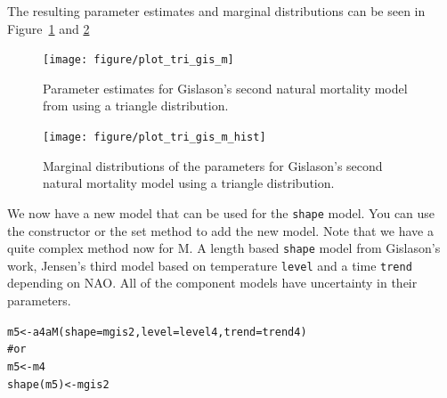 \documentclass[a4paper,english,10pt]{article}\usepackage[]{graphicx}\usepackage[]{color}
\makeatletter
\newcommand{\hlcom}[1]{\textcolor[rgb]{0.2,0.267,0.4}{#1}}%
\newcommand{\hlstd}[1]{\textcolor[rgb]{0,0,0}{#1}}%
\newcommand{\hlkwb}[1]{\textcolor[rgb]{0.361,0.506,0.596}{#1}}%
\newcommand{\hlkwc}[1]{\textcolor[rgb]{0.361,0.506,0.596}{#1}}%
\newcommand{\hlkwd}[1]{\textcolor[rgb]{0.361,0.506,0.596}{#1}}%
\newenvironment{kframe}{%
 \def\at@end@of@kframe{}%
 \ifinner\ifhmode%
  \def\at@end@of@kframe{\end{minipage}}%
  \begin{minipage}{\columnwidth}%
 \fi\fi%
 \def\FrameCommand##1{\hskip\@totalleftmargin \hskip-\fboxsep
 \colorbox{shadecolor}{##1}\hskip-\fboxsep
     \hskip-\linewidth \hskip-\@totalleftmargin \hskip\columnwidth}%
 \MakeFramed {\advance\hsize-\width
   \@totalleftmargin\z@ \linewidth\hsize
   \@setminipage}}%
 {\par\unskip\endMakeFramed%
 \at@end@of@kframe}
\newenvironment{knitrout}{}{} %
\newcommand{\code}[1]{{\texttt{#1}}}
\makeatother
\begin{document}
The resulting parameter estimates and marginal distributions can be seen in Figure~\ref{fig:plot_tri_gis_m} and \ref{fig:plot_tri_gis_m_hist}

\begin{knitrout}
\color{fgcolor}\begin{figure}[H]


{\centering \texttt{[image: figure/plot\_tri\_gis\_m]} 

}

\caption[Parameter estimates for Gislason's second natural mortality model from using a triangle distribution]{Parameter estimates for Gislason's second natural mortality model from using a triangle distribution.\label{fig:plot_tri_gis_m}}
\end{figure}


\end{knitrout}

\begin{knitrout}
\color{fgcolor}\begin{figure}[H]


{\centering \texttt{[image: figure/plot\_tri\_gis\_m\_hist]} 

}

\caption[Marginal distributions of the parameters for Gislason's second natural mortality model using a triangle distribution]{Marginal distributions of the parameters for Gislason's second natural mortality model using a triangle distribution.\label{fig:plot_tri_gis_m_hist}}
\end{figure}


\end{knitrout}

We now have a new model that can be used for the \code{shape} model. You can use the constructor or the set method to add the new model. Note that we have a quite complex method now for M. A length based \code{shape} model from Gislason's work, Jensen's third model based on temperature \code{level} and a time \code{trend} depending on NAO. All of the component models have uncertainty in their parameters.

\begin{knitrout}
\color{fgcolor}\begin{kframe}
\begin{alltt}
\hlstd{m5} \hlkwb{<-} \hlkwd{a4aM}\hlstd{(}\hlkwc{shape}\hlstd{=mgis2,} \hlkwc{level}\hlstd{=level4,} \hlkwc{trend}\hlstd{=trend4)}
\hlcom{# or}
\hlstd{m5} \hlkwb{<-} \hlstd{m4}
\hlkwd{shape}\hlstd{(m5)} \hlkwb{<-} \hlstd{mgis2}
\end{alltt}
\end{kframe}
\end{knitrout}
\end{document}
